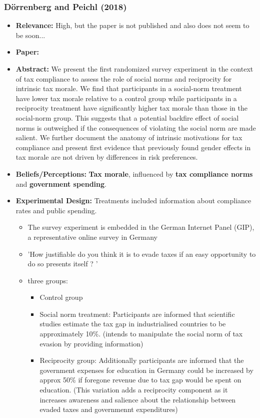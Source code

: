 \documentclass[a4paper, 12pt]{article}
\begin{document}
\subsubsection*{D\"orrenberg and Peichl (2018)}
\begin{itemize}
    \item \textbf{Relevance:} High, but the paper is not published and also does not seem to be soon...
    \item \textbf{Paper:} 
    \item \textbf{Abstract:} We present the first randomized survey experiment in the context of tax compliance to assess the role of social norms and reciprocity for intrinsic tax morale. We find that participants in a social-norm treatment have lower tax morale relative to a control group while participants in a reciprocity treatment have significantly higher tax morale than those in the social-norm group. This suggests that a potential backfire effect of social norms is outweighed if the consequences of violating the social norm are made salient. We further document the anatomy of intrinsic motivations for tax compliance and present first evidence that previously found gender effects in tax morale are not driven by differences in risk preferences.
    \item \textbf{Beliefs/Perceptions:} \textbf{Tax morale}, influenced by \textbf{tax compliance norms} and \textbf{government spending}.
    \item \textbf{Experimental Design:} Treatments included information about compliance rates and public spending.
    \begin{itemize}
        \item The survey experiment is embedded in the German Internet Panel (GIP), a representative online survey in Germany
        \item ’How justifiable do you think it is to evade taxes if an easy opportunity to do so presents itself ? ’
        \item three groups: 
        \begin{itemize}
            \item Control group
            \item Social norm treatment: Participants are informed that scientific studies estimate the tax gap in industrialised countries to be approximately 10\%. (intends to manipulate the social norm of tax evasion by providing information)
            \item Reciprocity group: Additionally participants are informed that the government expenses for education in Germany could be increased by approx 50\% if foregone revenue due to tax gap would be spent on education. (This variation adds a reciprocity component as it increases awareness and salience about the relationship between evaded taxes and governmennt expenditures)  
        \end{itemize}
    \end{itemize}
\end{itemize}
\end{document}
